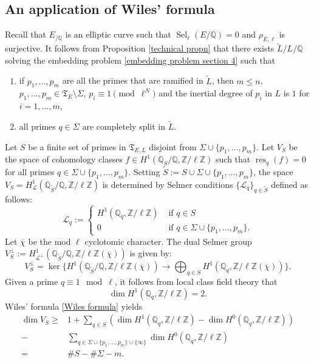 \documentclass[11pt,reqno]{amsart}
\newcommand{\Z}{\mathbb{Z}}
\newcommand{\Q}{\mathbb{Q}}
\newcommand{\cL}{\mathcal{L}}
\newcommand{\op}[1]{\operatorname{#1}}
\numberwithin{equation}{section}
\begin{document}
\subsection{An application of Wiles' formula}\label{section 4.2}
\par Recall that $E_{/\Q}$ is an elliptic curve such that $\op{Sel}_\ell(E/\Q)=0$ and $\rho_{E,\ell}$ is surjective. It follows from Proposition \ref{technical propn} that there exists $\widetilde{L}/L/\Q$ solving the embedding problem \eqref{embedding problem section 4} such that
\begin{enumerate}[label=(\roman*)]
        \item if $p_1, \dots, p_m$ are all the primes that are ramified in $\widetilde{L}$, then $m\leq n$, $p_1, \dots, p_m\in \mathfrak{T}_E\setminus \Sigma$, $p_i\equiv 1\pmod{\ell^N}$ and the inertial degree of $p_i$ in $L$ is $1$ for $i=1, \dots, m$,
        \item all primes $q\in \Sigma$ are completely split in $\widetilde{L}$. 
    \end{enumerate}
    Let $S$ be a finite set of primes in $\mathfrak{T}_{E,L}$ disjoint from $\Sigma \cup \{p_1, \dots, p_m\}$. Let $V_S$ be the space of cohomology classes $f\in H^1(\Q_S/\Q, \Z/\ell\Z)$ such that $\op{res}_q(f)=0$ for all primes $q\in \Sigma \cup \{p_1, \dots, p_m\}$. 
Setting $\widetilde{S}:=S\cup \Sigma\cup\{p_1, \dots, p_m\}$, the space $V_S=H^1_{\cL}(\Q_{\widetilde{S}}/\Q, \Z/\ell\Z)$ is determined by Selmer conditions $\{\mathcal{L}_q\}_{q\in \widetilde{S}}$ defined as follows:
\[\cL_q:=\begin{cases}
    H^1(\Q_q, \Z/\ell\Z) &\text{ if } q\in S\\
   0 &\text{ if } q\in \Sigma\cup\{p_1, \dots, p_m\}.
\end{cases}\]
Let $\overline{\chi}$ be the mod $\ell$ cyclotomic character. The dual Selmer group $V_S^\perp:=H^1_{\cL^\perp}(\Q_{\widetilde{S}}/\Q, \Z/\ell\Z(\overline{\chi}))$ is given by:
\[V_S^\perp=\op{ker}\{H^1(\Q_{\widetilde{S}}/\Q, \Z/\ell\Z(\overline{\chi}))\longrightarrow \bigoplus_{q\in S} H^1(\Q_q, \Z/\ell\Z(\overline{\chi}))\}.\]
Given a prime $q\equiv 1\mod{\ell}$, it follows from local class field theory that \[\dim H^1(\Q_q, \Z/\ell\Z)=2.\] Wiles' formula \eqref{Wiles formula} yields 
\[\begin{split}\dim V_S\geq & 1+\sum_{q\in S} \left( \dim H^1(\Q_q, \Z/\ell\Z)- \dim H^0(\Q_q, \Z/\ell\Z)\right)\\ - &\sum_{q\in \Sigma\cup\{p_1, \dots, p_m\}\cup\{\infty\}}  \dim H^0(\Q_q, \Z/\ell\Z)\\ 
=& \#S-\#\Sigma-m.
\end{split}\]
\end{document}
